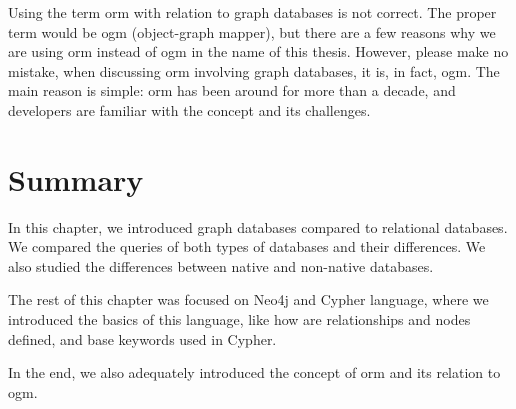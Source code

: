 Using the term \acrshort{orm} with relation to graph databases is not correct. The proper term would be \acrshort{ogm} (object-graph mapper),
but there are a few reasons why we are using \acrshort{orm} instead of \acrshort{ogm} in the name of this thesis. However, please make no mistake,
when discussing \acrshort{orm} involving graph databases, it is, in fact, \acrshort{ogm}.
The main reason is simple: \acrshort{orm} has been around for more than a decade, and developers are familiar with the concept and its challenges.

\section{Summary}

In this chapter, we introduced graph databases compared to relational databases. We compared the queries of both types of databases and their differences.
We also studied the differences between native and non-native databases.

The rest of this chapter was focused on Neo4j and Cypher language, where we introduced the basics of this language, like how are relationships and nodes defined,
and base keywords used in Cypher.

In the end, we also adequately introduced the concept of \acrshort{orm} and its relation to \acrshort{ogm}.
